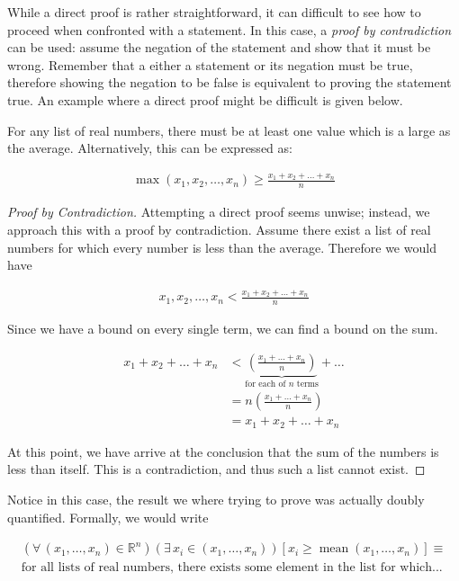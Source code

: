 \documentclass[twoside]{report}
\DeclareMathOperator{\mean}{mean}
\begin{document}
While a direct proof is rather straightforward, it can difficult to see how to proceed when confronted with a statement. In this case, a \emph{proof by contradiction} can be used: assume the negation of the statement and show that it must be wrong. Remember that a either a statement or its negation must be true, therefore showing the negation to be false is equivalent to proving the statement true. An example where a direct proof might be difficult is given below.

\vspace{\baselineskip}
\begin{theorem}
	For any list of real numbers, there must be at least one value which is a large as the average. Alternatively, this can be expressed as:
	
	\begin{align}
		\max(x_1, x_2, \dots, x_n) \ge \frac{x_1 + x_2 + \dots + x_n}{n}
	\end{align}
\end{theorem}

\begin{proof}[Proof by Contradiction]
	Attempting a direct proof seems unwise; instead, we approach this with a proof by contradiction. Assume there exist a list of real numbers for which every number is less than the average. Therefore we would have
	
	\begin{align*}
		x_1, x_2, \dots, x_n < \frac{x_1 + x_2 + \dots + x_n}{n}
	\end{align*} 
	
	Since we have a bound on every single term, we can find a bound on the sum.
	
	\begin{align*}
		x_1 + x_2 + \dots + x_n &< \underbrace{\left( \frac{x_1 + \dots + x_n}{n} \right)}_\text{for each of $n$ terms} + \dots \\
		&= n \left( \frac{x_1 + \dots + x_n}{n} \right) \\
		&= x_1 + x_2 + \dots + x_n
	\end{align*}
	
	At this point, we have arrive at the conclusion that the sum of the numbers is less than itself. This is a contradiction, and thus such a list cannot exist.
\end{proof}

Notice in this case, the result we where trying to prove was actually doubly quantified. Formally, we would write

\begin{align*}
	(\forall \, (x_1, \dots, x_n) \in \mathbb{R}^n)(\exists \, x_i \in (x_1, \dots, x_n))[x_i \ge \mean(x_1, \dots, x_n)] \equiv \\
	\text{for all lists of real numbers, there exists some element in the list for which...}
\end{align*}
\end{document}
